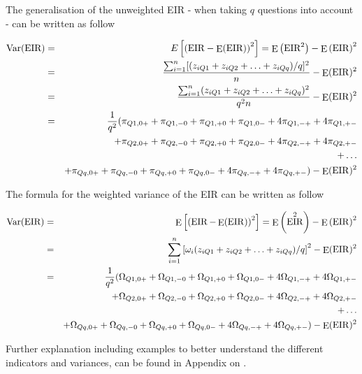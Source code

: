 \documentclass[12pt,a4paper,oneside]{book}
\DeclareMathOperator{\Var}{Var}
\DeclareMathOperator{\E}{E}
\DeclareMathOperator{\EIR}{EIR}
\begin{document}
The generalisation of the unweighted EIR - when taking $q$ questions into account - can be written as follow

\begin{eqnarray}
         \Var(\text{EIR}) &=& E \left[ \left(\text{EIR}-\E(\text{EIR}) \right)^2 \right] =  \E \left( \text{EIR}^2\right) - \E \left( \text{EIR}\right)^2 \\ 
         &=&  \frac{\sum^n_{i=1}[(z_{iQ1} + z_{iQ2} + \ldots + z_{iQq})/q]^2}{n} - \E (\EIR)^2 \\
        &=&  \frac{\sum^n_{i=1}(z_{iQ1} + z_{iQ2} + \ldots + z_{iQq})^2}{q^2 n} - \E (\EIR)^2 \\
        &=& \frac{1}{q^2} \Large( \pi_{Q1,0+} + \pi_{Q1,-0} + \pi_{Q1,+0} + \pi_{Q1,0-} +4\pi_{Q1,-+} +4\pi_{Q1,+-} \nonumber \\ 
        && + \pi_{Q2,0+} + \pi_{Q2,-0} + \pi_{Q2,+0} + \pi_{Q2,0-} +4\pi_{Q2,-+} +4\pi_{Q2,+-} \nonumber \\ 
        &&  + \ldots \nonumber \\ 
        && + \pi_{Qq,0+} + \pi_{Qq,-0} + \pi_{Qq,+0} + \pi_{Qq,0-} +4\pi_{Qq,-+} +4\pi_{Qq,+-} \Large) - \E (\EIR)^2 \nonumber \\ 
\end{eqnarray}

The formula for the weighted variance of the EIR can be written as follow

\begin{eqnarray}
         \Var(\text{EIR}) &=& \E \left[ \left( \EIR - \E(\EIR) \right)^2 \right] =  \E \left( \EIR^2\right) - \E \left( \EIR \right)^2 \\ 
         &=&  \sum^n_{i=1} \left[\omega_i (z_{iQ1} + z_{iQ2} + \ldots + z_{iQq})/q \right]^2 - \E (\EIR)^2 \\
        &=& \frac{1}{q^2} \Large( \Omega_{Q1,0+} + \Omega_{Q1,-0} + \Omega_{Q1,+0} + \Omega_{Q1,0-} +4\Omega_{Q1,-+} +4\Omega_{Q1,+-} \nonumber \\ 
        && + \Omega_{Q2,0+} + \Omega_{Q2,-0} + \Omega_{Q2,+0} + \Omega_{Q2,0-} +4\Omega_{Q2,-+} +4\Omega_{Q2,+-} \nonumber \\ 
        &&  + \ldots \nonumber \\ 
        && + \Omega_{Qq,0+} + \Omega_{Qq,-0} + \Omega_{Qq,+0} + \Omega_{Qq,0-} +4\Omega_{Qq,-+} +4\Omega_{Qq,+-} \Large) - \E (\EIR)^2 \nonumber \\ 
\end{eqnarray}


Further explanation including examples to better understand the different indicators and variances, can be found in Appendix on .
\end{document}
